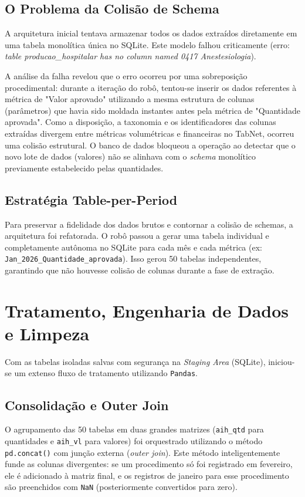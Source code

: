\documentclass[12pt,a4paper]{report}
\begin{document}
\section{O Problema da Colisão de Schema}
A arquitetura inicial tentava armazenar todos os dados extraídos diretamente em uma tabela monolítica única no SQLite. Este modelo falhou criticamente (erro: \textit{table producao\_hospitalar has no column named 0417 Anestesiologia}).

A análise da falha revelou que o erro ocorreu por uma sobreposição procedimental: durante a iteração do robô, tentou-se inserir os dados referentes à métrica de "Valor aprovado" utilizando a mesma estrutura de colunas (parâmetros) que havia sido moldada instantes antes pela métrica de "Quantidade aprovada". Como a disposição, a taxonomia e os identificadores das colunas extraídas divergem entre métricas volumétricas e financeiras no TabNet, ocorreu uma colisão estrutural. O banco de dados bloqueou a operação ao detectar que o novo lote de dados (valores) não se alinhava com o \textit{schema} monolítico previamente estabelecido pelas quantidades.

\section{Estratégia Table-per-Period}
Para preservar a fidelidade dos dados brutos e contornar a colisão de schemas, a arquitetura foi refatorada. O robô passou a gerar uma tabela individual e completamente autônoma no SQLite para cada mês e cada métrica (ex: \texttt{Jan\_2026\_Quantidade\_aprovada}). Isso gerou 50 tabelas independentes, garantindo que não houvesse colisão de colunas durante a fase de extração.

\chapter{Tratamento, Engenharia de Dados e Limpeza}

Com as tabelas isoladas salvas com segurança na \textit{Staging Area} (SQLite), iniciou-se um extenso fluxo de tratamento utilizando \texttt{Pandas}.

\section{Consolidação e Outer Join}
O agrupamento das 50 tabelas em duas grandes matrizes (\texttt{aih\_qtd} para quantidades e \texttt{aih\_vl} para valores) foi orquestrado utilizando o método \texttt{pd.concat()} com junção externa (\textit{outer join}). Este método inteligentemente funde as colunas divergentes: se um procedimento só foi registrado em fevereiro, ele é adicionado à matriz final, e os registros de janeiro para esse procedimento são preenchidos com \texttt{NaN} (posteriormente convertidos para zero).
\end{document}
